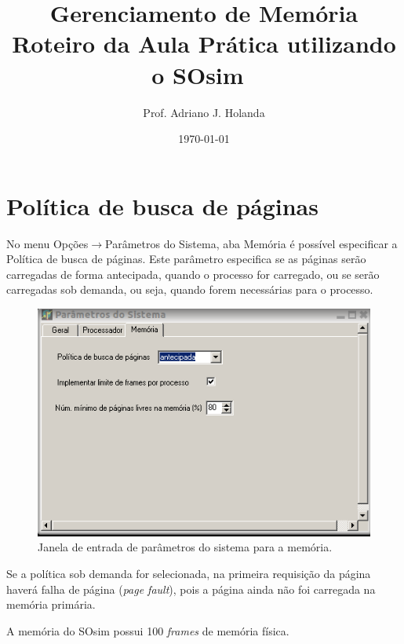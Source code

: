 \documentclass[11pt,a4paper]{article}
\title{Gerenciamento de Memória \\ {\small Roteiro da Aula Prática utilizando o SOsim~\cite{bib:sosimlab}}}
\author{Prof. Adriano J. Holanda}
\date{\today}
\begin{document}
\maketitle

\section{Política de busca de páginas}

No menu {\rm Opções$\rightarrow$Parâmetros do Sistema, aba Memória} é
possível especificar a {\rm Política de busca de páginas}. Este
parâmetro especifica se as páginas serão carregadas de forma {\rm
  antecipada}, quando o processo for carregado, ou se serão carregadas
sob demanda, ou seja, quando forem necessárias para o processo.

\begin{figure}[h]
  \centering
  \includegraphics[scale=.45]{../img/sosim-parsys.png}
  \caption{Janela de entrada de parâmetros do sistema para a memória.}
  \label{fig:parsys}
\end{figure}

Se a política sob demanda for selecionada, na primeira requisição da
página haverá falha de página ({\em page fault}), pois a página ainda
não foi carregada na memória primária.

A memória do SOsim possui 100 {\em frames} de memória física.
\end{document}
